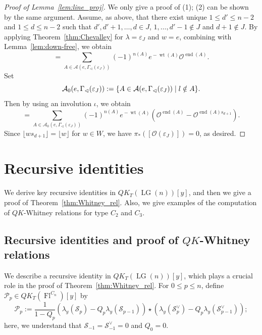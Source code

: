 \documentclass[a4paper, 11pt, reqno]{amsart}
\numberwithin{equation}{section}
\newcommand{\CA}{\mathcal{A}}
\newcommand{\CO}{\mathcal{O}}
\newcommand{\CP}{\mathcal{P}}
\newcommand{\CS}{\mathcal{S}}
\newcommand{\ve}{\varepsilon}
\newcommand{\vtl}{\vartriangleleft}
\newcommand{\LG}{\operatorname{LG}}
\newcommand{\FlC}[1]{\operatorname{Fl}^{C_{#1}}}
\newcommand{\mcr}[1]{\lfloor #1 \rfloor}
\DeclareMathOperator{\ed}{end}
\DeclareMathOperator{\wt}{wt}
\theoremstyle{plain}
\theoremstyle{definition}
\theoremstyle{remark}
\begin{document}
\begin{proof}[Proof of Lemma~\ref{lem:line_proj}]
We only give a proof of (1); (2) can be shown by the same argument. 
Assume, as above, that there exist unique $1 \le d' \le n-2$ and $1 \le d \le n-2$ such that $d', d'+1, \ldots, d \in J$, $1, \ldots, d'-1 \notin J$ and $d+1 \notin J$. 
By applying Theorem~\ref{thm:Chevalley} for $\lambda = \ve_{J}$ and $w = e$, combining with Lemma~\ref{lem:down-free}, we obtain 
\begin{equation}
[\CO(\ve_{J})] = \sum_{A \in \CA(e, \Gamma_{\vtl}(\ve_{J}))} (-1)^{n(A)} e^{{}-\wt(A)} \CO^{\ed(A)}. 
\end{equation}
Set 
\begin{equation}
\CA_{0}(e, \Gamma_{\vtl}(\ve_{J})) := \{ A \in \CA(e, \Gamma_{\vtl}(\ve_{J})) \mid l \notin A \}. \\ 
\end{equation}
Then by using an involution $\iota$, we obtain 
\begin{equation}
[\CO(\ve_{J})] = \sum_{A \in \CA_{0}(e, \Gamma_{\vtl}(\ve_{J}))} (-1)^{n(A)} e^{{}-\wt(A)} (\CO^{\ed(A)} - \CO^{\ed(A)s_{d+1}}). 
\end{equation}
Since $\mcr{ws_{d+1}} = \mcr{w}$ for $w \in W$, we have $\pi_{\ast}([\CO(\ve_{J})]) = 0$, as desired. 
\end{proof}

\section{Recursive identities} \label{sec:recursive}
We derive key recursive identities in $QK_{T}(\LG(n))[y]$, and then we give a proof of Theorem~\ref{thm:Whitney_rel}. 
Also, we give examples of the computation of $QK$-Whitney relations for type $C_{2}$ and $C_{3}$. 

\subsection{\texorpdfstring{Recursive identities and proof of $QK$-Whitney relations}{Recursive identities and proof of QK-Whitney relations}}
We describe a recursive identity in $QK_{T}(\LG(n))[y]$, which plays a crucial role in the proof of Theorem~\ref{thm:Whitney_rel}. 
For $0 \le p \le n$, define $\CP_{p} \in QK_{T}(\FlC{n})[y]$ by 
\begin{equation} \label{eq:def_Pp}
\CP_{p} := \frac{1}{1-Q_{p}}(\lambda_{y}(\CS_{p}) - Q_{p}\lambda_{y}(\CS_{p-1})) \star (\lambda_{y}(\CS_{p}^{\vee}) - Q_{p}\lambda_{y}(\CS_{p-1}^{\vee}));  
\end{equation}
here, we understand that $\CS_{-1} = \CS_{-1}^{\vee} = 0$ and $Q_{0} = 0$. 
\end{document}
